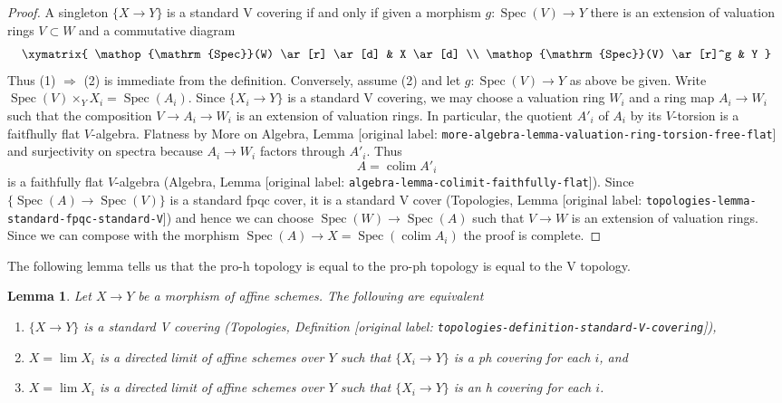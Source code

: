 \documentclass[10pt,a4paper]{article}
\theoremstyle{plain}
\newtheorem{lemma}[subsection]{Lemma}
\theoremstyle{definition}
\theoremstyle{remark}
\numberwithin{equation}{subsection}
\def\lim{\mathop{\mathrm{lim}}\nolimits}
\def\colim{\mathop{\mathrm{colim}}\nolimits}
\def\Spec{\mathop{\mathrm{Spec}}}
\begin{document}
\begin{proof}
A singleton $\{X \to Y\}$ is a standard V covering if and only if
given a morphism $g : \Spec(V) \to Y$ there is an extension of
valuation rings $V \subset W$ and a commutative diagram
$$
\xymatrix{
\Spec(W) \ar[r] \ar[d] & X \ar[d] \\
\Spec(V) \ar[r]^g & Y
}
$$
Thus (1) $\Rightarrow$ (2) is immediate from the definition.
Conversely, assume (2) and let $g : \Spec(V) \to Y$ as above
be given. Write $\Spec(V) \times_Y X_i = \Spec(A_i)$.
Since $\{X_i \to Y\}$ is a standard V covering, we may choose
a valuation ring $W_i$ and a ring map $A_i \to W_i$ such that
the composition $V \to A_i \to W_i$ is an extension of valuation
rings. In particular, the quotient $A'_i$ of $A_i$ by its
$V$-torsion is a faitfhully flat $V$-algebra. Flatness by
More on Algebra, Lemma
\textnormal{[original label: \nolinkurl{more-algebra-lemma-valuation-ring-torsion-free-flat}]} and
surjectivity on spectra because $A_i \to W_i$ factors through $A'_i$.
Thus
$$
A = \colim A'_i
$$
is a faithfully flat $V$-algebra
(Algebra, Lemma \textnormal{[original label: \nolinkurl{algebra-lemma-colimit-faithfully-flat}]}).
Since $\{\Spec(A) \to \Spec(V)\}$ is a standard fpqc cover, it
is a standard V cover
(Topologies, Lemma \textnormal{[original label: \nolinkurl{topologies-lemma-standard-fpqc-standard-V}]})
and hence we can choose $\Spec(W) \to \Spec(A)$ such that
$V \to W$ is an extension of valuation rings. Since we can compose
with the morphism $\Spec(A) \to X = \Spec(\colim A_i)$
the proof is complete.
\end{proof}

\noindent
The following lemma tells us that the pro-h topology is equal to the
pro-ph topology is equal to the V topology.

\begin{lemma}
\label{lemma-pro-h-V}
Let $X \to Y$ be a morphism of affine schemes. The following are equivalent
\begin{enumerate}
\item $\{X \to Y\}$ is a standard V covering
(Topologies, Definition \textnormal{[original label: \nolinkurl{topologies-definition-standard-V-covering}]}),
\item $X = \lim X_i$ is a directed limit of affine schemes over $Y$
such that $\{X_i \to Y\}$ is a ph covering for each $i$, and
\item $X = \lim X_i$ is a directed limit of affine schemes over $Y$
such that $\{X_i \to Y\}$ is an h covering for each $i$.
\end{enumerate}
\end{lemma}
\end{document}
